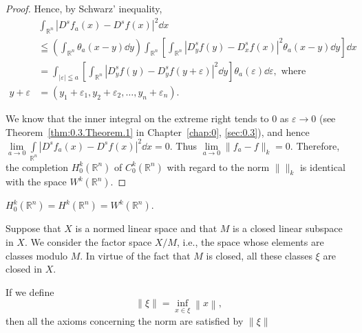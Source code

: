 \begin{proof}
Hence, by Schwarz' inequality, 
\[
\begin{aligned}
& \int_ {\mathbb{R}^{n}} | D ^{s} f_{a} (x)- D ^{s} f (x) | ^{2} \dd x
\\
& \leqq \left(\int_ {\mathbb{R}^{n}} \theta_{a} (x- y) \dd y\right) \int_ {\mathbb{R}^{n}} \left[ \int_ {\mathbb{R}^{n}} | D_{y} ^{s} f (y)- D_{x} ^{s} f (x) | ^{2} \theta_{a} (x- y) \dd y \right] \dd x
\\
&= \int_{| \varepsilon | \leqq a} \left[ \int_ {\mathbb{R}^{n}} | D_{y} ^{s} f (y)- D_{y} ^{s} f (y + \varepsilon) | ^{2} \dd y \right] \theta_{a} (\varepsilon) \dd \varepsilon , \text{ where }
\\
y + \varepsilon &= (y_{1} + \varepsilon_{1}, y_{2} + \varepsilon_{2}, \ldots , y_{n} + \varepsilon_{n}).
\end{aligned}
\]

We know that the inner integral on the extreme right tends to $0$ as $\varepsilon \to 0$ (see Theorem~\ref{thm:0.3.Theorem.1} in Chapter~\ref{chap:0}, \ref{sec:0.3}), and hence $\lim\limits_{a\to 0}\int \limits_{\mathbb{R}^{n}}|D^s f_a(x)- D^s f(x)|^2 \dd x = 0$. Thus $\lim\limits_{a\to 0}\|f_a- f\|_k = 0$. Therefore, the completion $H_0^k (\mathbb{R}^{n})$ of $C_0^k (\mathbb{R}^{n})$ with regard to the norm $\|\|_k$ is identical with the space $W^{k}(\mathbb{R}^{n})$. 
\end{proof}

\begin{corollaryu} $H_0^k (\mathbb{R}^{n}) = H^k (\mathbb{R}^{n}) = W^k (\mathbb{R}^{n})$. 
\end{corollaryu}


\label{sec:I.11}

Suppose that $X$ is a normed linear space and that $M$ is a closed linear subspace in $X$. We consider the factor space $X/M$, i.e., the space whose elements are classes modulo $M$. In virtue of the fact that $M$ is closed, all these classes $\xi$ are closed in $X$. 

\begin{propositionu} If we define 
\begin{equation}\label{eq:I.11.1}
\left\| \xi \right\| = \inf\limits_{x \in \xi} \left\| x \right\|,
\end{equation}
then all the axioms concerning the norm are satisfied by $\|\xi \|$ 
\end{propositionu}

